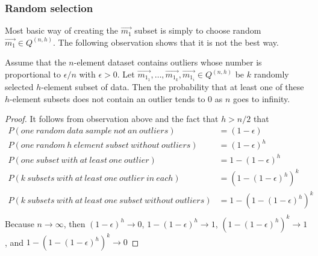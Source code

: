 \subsubsection*{Random selection} \label{section:random:h:samples}
Most basic way of creating the $\vec{m_1}$ subset is simply to choose random $\vec{m_1} \in Q^{(n, h)}$. The following observation shows that it is not the best way.

\begin{observation} \label{hrandomsamples}

    Assume that the $n$-element dataset contains outliers whose number is proportional to $\epsilon / n$ with $\epsilon > 0$. Let $\vec{m_{1_1}}, \ldots ,\vec{m_{1_k}}, \vec{m_{1_i}} \in Q^{(n, h)} $ be $k$ randomly selected $h$-element subset of data. Then the probability that at least one of these $h$-element subsets does not contain an outlier tends to $0$ as $n$ goes to infinity.
\end{observation}

\begin{proof}
    It follows from observation above and the fact that $h > n/2$ that
    \begin{align*}
        P(one~random~data~sample~not~an~outliers) &= (1-\epsilon) \\
        P(one~random~h~element~subset~without~outliers) &= (1-\epsilon)^h \\
        P(one~subset~with~at~least~one~outlier) &= 1-(1-\epsilon)^h \\
        P(k~subsets~with~at~least~one~outlier~in~each) &= (1-(1-\epsilon)^h)^k \\
        P(k~subsets~with~at~least~one~subset~without~outliers) &= 1-(1-(1-\epsilon)^h)^k \\
    \end{align*}
    Because
$n \rightarrow \infty$, then    
$ (1-\epsilon)^h  \rightarrow 0 $,    
$ 1- (1-\epsilon)^h  \rightarrow 1$, 
$ (1-(1-\epsilon)^h)^k  \rightarrow 1$, and 
$1- (1-(1-\epsilon)^h)^k  \rightarrow 0 $
\end{proof}

